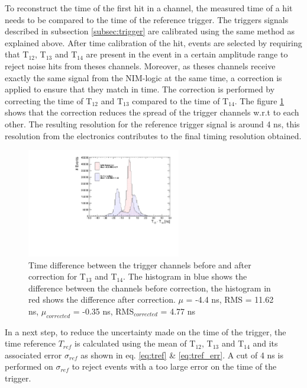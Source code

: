 \documentclass[twoside,a4paper,11pt]{article}
\begin{document}
To reconstruct the time of the first hit in a channel, the measured time of a hit needs to be compared to the time of the reference trigger. The triggers signals described in subsection \ref{subsec:trigger} are calibrated using the same method as explained above. After time calibration of the hit, events are selected by requiring that T$_{12}$, T$_{13}$ and T$_{14}$ are present in the event in a certain amplitude range to reject noise hits from theses channels. Moreover, as theses channels receive exactly the same signal from the NIM-logic at the same time, a correction is applied to ensure that they match in time. The correction is performed by correcting the time of T$_{12}$ and T$_{13}$ compared to the time of T$_{14}$. The figure \ref{fig:T0_Correction} shows that the correction reduces the spread of the trigger channels w.r.t to each other. The resulting resolution for the reference trigger signal is around 4 ns, this resolution from the electronics contributes to the final timing resolution obtained.
\begin{figure}[htbp]
\begin{center}
\includegraphics[width=0.6\textwidth]{fig/T0s/T0_Resolution_6.pdf}
\caption{Time difference between the trigger channels before and after correction for T$_{13}$ and T$_{14}$. The histogram in blue shows the difference between the channels before correction, the histogram in red shows the difference after correction. $\mu$ = -4.4 ns, RMS = 11.62 ns, $\mu_{corrected}$ = -0.35 ns, RMS$_{corrected}$ = 4.77 ns}
\label{fig:T0_Correction}
\end{center}
\end{figure}
In a next step, to reduce the uncertainty made on the time of the trigger, the time reference $T_{ref}$ is calculated using the mean of T$_{12}$, T$_{13}$ and T$_{14}$ and its associated error $\sigma_{ref}$ as shown in eq. \ref{eq:tref} \& \ref{eq:tref_err}. A cut of 4 ns is performed on $\sigma_{ref}$ to reject events with a too large error on the time of the trigger.
\end{document}
